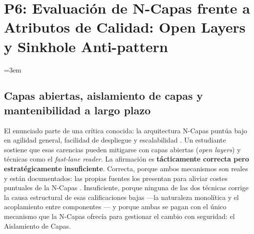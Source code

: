 
\chapter{P6: Evaluación de N-Capas frente a Atributos de Calidad: Open Layers y Sinkhole Anti-pattern}
\label{sec:p6}

\begingroup\emergencystretch=3em 

\section{Capas abiertas, aislamiento de capas y mantenibilidad a largo plazo}
\label{sec:p6-aislamiento}

El enunciado parte de una crítica conocida: la arquitectura N-Capas puntúa bajo en agilidad
general, facilidad de despliegue y escalabilidad \parencite[8-9]{richards2015}. Un estudiante
sostiene que esas carencias pueden mitigarse con capas abiertas (\emph{open layers}) y técnicas
como el \emph{fast-lane reader}. La afirmación es \textbf{tácticamente correcta pero
estratégicamente insuficiente}. Correcta, porque ambos mecanismos son reales y están
documentados: las propias fuentes los presentan para aliviar costes puntuales de la N-Capas
\parencite[cap.~10]{richardsford2020}. Insuficiente, porque ninguna de las dos técnicas corrige
la causa estructural de esas calificaciones bajas —la naturaleza monolítica y el acoplamiento
entre componentes \parencite[8-9]{richards2015}— y porque ambas se pagan con el único mecanismo
que la N-Capas ofrecía para gestionar el cambio con seguridad: el Aislamiento de Capas.

